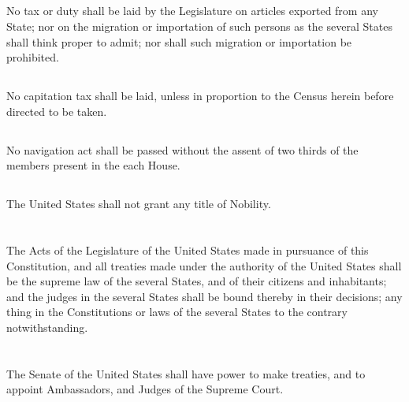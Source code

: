 \documentclass{constitution}
\begin{document}
\section{}
No tax or duty shall be laid by the Legislature on articles exported from any State;
nor on the migration or importation of such persons as the several States shall think proper to admit;
nor shall such migration or importation be prohibited.

\section{}
No capitation tax shall be laid, unless in proportion to the Census herein before directed to be taken.

\section{}
No navigation act shall be passed without the assent of two thirds of the members present in the each House.

\section{}
The United States shall not grant any title of Nobility.

\chapter{}
The Acts of the Legislature of the United States made in pursuance of this Constitution,
and all treaties made under the authority of the United States
shall be the supreme law of the several States, and of their citizens and inhabitants;
and the judges in the several States shall be bound thereby in their decisions;
any thing in the Constitutions or laws of the several States to the contrary notwithstanding.

\chapter{}
\section{}
The Senate of the United States shall have power to make treaties,
and to appoint Ambassadors,
and Judges of the Supreme Court.
\end{document}
